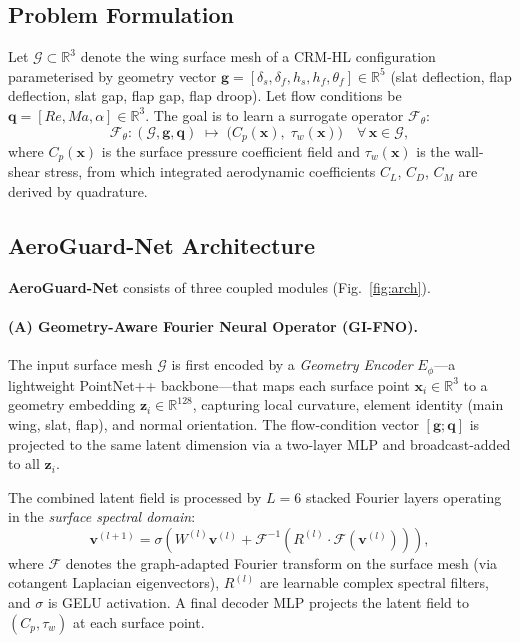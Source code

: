 \documentclass[10pt,twocolumn,letterpaper]{article}
\newcommand{\aeroguard}{\textbf{AeroGuard-Net}}
\newcommand{\CL}{C_L}
\newcommand{\CD}{C_D}
\newcommand{\CM}{C_M}
\newcommand{\Cp}{C_p}
\begin{document}
\subsection{Problem Formulation}
\label{subsec:formulation}

Let $\mathcal{G} \subset \mathbb{R}^3$ denote the wing surface mesh of
a CRM-HL configuration parameterised by geometry vector
$\mathbf{g} = [\delta_s, \delta_f, h_s, h_f, \theta_f] \in \mathbb{R}^5$
(slat deflection, flap deflection, slat gap, flap gap, flap droop). Let
flow conditions be $\mathbf{q} = [Re, Ma, \alpha] \in \mathbb{R}^3$.
The goal is to learn a surrogate operator $\mathcal{F}_\theta$:
\begin{equation}
  \mathcal{F}_\theta : (\mathcal{G}, \mathbf{g}, \mathbf{q})
    \;\longmapsto\;
    \bigl(\Cp(\mathbf{x}),\; \tau_w(\mathbf{x})\bigr)
    \quad \forall\, \mathbf{x} \in \mathcal{G},
  \label{eq:operator}
\end{equation}
where $\Cp(\mathbf{x})$ is the surface pressure coefficient field and
$\tau_w(\mathbf{x})$ is the wall-shear stress, from which integrated
aerodynamic coefficients $\CL$, $\CD$, $\CM$ are derived by quadrature.

\subsection{AeroGuard-Net Architecture}
\label{subsec:architecture}

\aeroguard{} consists of three coupled modules (Fig.~\ref{fig:arch}).

\paragraph{(A) Geometry-Aware Fourier Neural Operator (GI-FNO).}
The input surface mesh $\mathcal{G}$ is first encoded by a
\emph{Geometry Encoder} $E_\phi$—a lightweight PointNet++
\cite{Qi2017PointNet++} backbone—that maps each surface point
$\mathbf{x}_i \in \mathbb{R}^3$ to a geometry embedding
$\mathbf{z}_i \in \mathbb{R}^{128}$, capturing local curvature,
element identity (main wing, slat, flap), and normal orientation.
The flow-condition vector $[\mathbf{g}; \mathbf{q}]$ is projected to
the same latent dimension via a two-layer MLP and broadcast-added to
all $\mathbf{z}_i$.

The combined latent field is processed by $L=6$ stacked
Fourier layers operating in the \emph{surface spectral domain}:
\begin{equation}
  \mathbf{v}^{(l+1)} = \sigma\!\left(
    W^{(l)} \mathbf{v}^{(l)} +
    \mathcal{F}^{-1}\!\left(R^{(l)} \cdot \mathcal{F}\!\left(\mathbf{v}^{(l)}\right)\right)
  \right),
  \label{eq:fno_layer}
\end{equation}
where $\mathcal{F}$ denotes the graph-adapted Fourier transform on the
surface mesh (via cotangent Laplacian eigenvectors), $R^{(l)}$ are
learnable complex spectral filters, and $\sigma$ is GELU activation.
A final decoder MLP projects the latent field to $(\Cp, \tau_w)$ at
each surface point.
\end{document}
